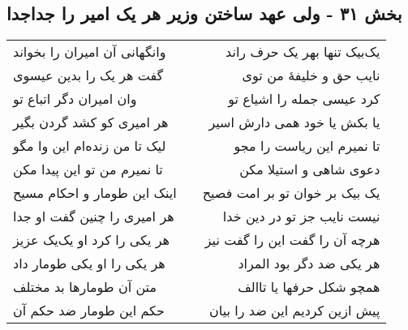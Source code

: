 \begin{center}
\section*{بخش ۳۱ - ولی عهد ساختن وزیر هر یک امیر را جداجدا}
\label{sec:sh031}
\begin{longtable}{l p{0.5cm} r}
وانگهانی آن امیران را بخواند
&&
یک‌بیک تنها بهر یک حرف راند
\\
گفت هر یک را بدین عیسوی
&&
نایب حق و خلیفهٔ من توی
\\
وان امیران دگر اتباع تو
&&
کرد عیسی جمله را اشیاع تو
\\
هر امیری کو کشد گردن بگیر
&&
یا بکش یا خود همی دارش اسیر
\\
لیک تا من زنده‌ام این وا مگو
&&
تا نمیرم این ریاست را مجو
\\
تا نمیرم من تو این پیدا مکن
&&
دعوی شاهی و استیلا مکن
\\
اینک این طومار و احکام مسیح
&&
یک بیک بر خوان تو بر امت فصیح
\\
هر امیری را چنین گفت او جدا
&&
نیست نایب جز تو در دین خدا
\\
هر یکی را کرد او یک‌یک عزیز
&&
هرچه آن را گفت این را گفت نیز
\\
هر یکی را او یکی طومار داد
&&
هر یکی ضد دگر بود المراد
\\
متن آن طومارها بد مختلف
&&
همچو شکل حرفها یا تاالف
\\
حکم این طومار ضد حکم آن
&&
پیش ازین کردیم این ضد را بیان
\\
\end{longtable}
\end{center}
